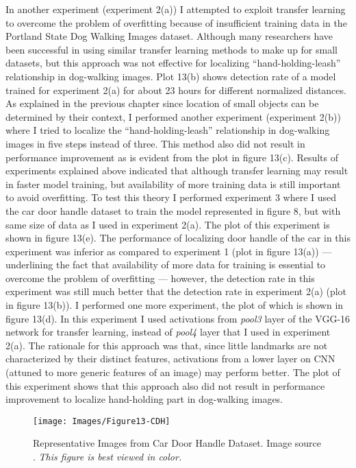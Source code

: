 \documentclass [11pt,letterpaper ,twoside ,openany ]{report}
\begin{document}
    In another experiment (experiment 2(a)) I attempted to exploit transfer learning to overcome the problem of overfitting because of insufficient training data in the Portland State Dog Walking Images dataset. Although many researchers \cite{oquab2014learning,ahmed2008training,collobert2011natural} have been successful in using similar transfer learning methods to make up for small datasets, but this approach was not effective for localizing ``hand-holding-leash'' relationship in dog-walking images. Plot 13(b) shows detection rate of a model trained for experiment 2(a) for about 23 hours for different normalized distances. As explained in the previous chapter since location of small objects can be determined by their context, I performed another experiment (experiment 2(b)) where I tried to localize the ``hand-holding-leash'' relationship in dog-walking images in five steps instead of three. This method also did not result in performance improvement as is evident from the plot in figure 13(c). Results of experiments explained above indicated that although transfer learning may result in faster model training, but availability of more training data is still important to avoid overfitting. To test this theory I performed experiment 3 where I used the car door handle dataset to train the model represented in figure 8, but with same size of data as I used in experiment 2(a). The plot of this experiment is shown in figure 13(e). The performance of localizing door handle of the car in this experiment was inferior as compared to experiment 1 (plot in figure 13(a)) --- underlining the fact that availability of more data for training is essential to overcome the problem of overfitting --- however, the detection rate in this experiment was still much better that the detection rate in experiment 2(a) (plot in figure 13(b)). I performed one more experiment, the plot of which is shown in figure 13(d). In this experiment I used activations from \textit{pool3} layer of the VGG-16 network for transfer learning, instead of \textit{pool4} layer that I used in experiment 2(a). The rationale for this approach was that, since little landmarks are not characterized by their distinct features, activations from a lower layer on CNN (attuned to more generic features of an image) may perform better. The plot of this experiment shows that this approach also did not result in performance improvement to localize hand-holding part in dog-walking images. 

    \begin{figure}[b!]
      \centering
      \texttt{[image: Images/Figure13-CDH]}
      \caption{Representative Images from Car Door Handle Dataset. Image source \cite{Singh_2016_CVPR}. \textit{This figure is best viewed in color.}}
      \label{fig:cdh}
    \end{figure}        
\end{document}
